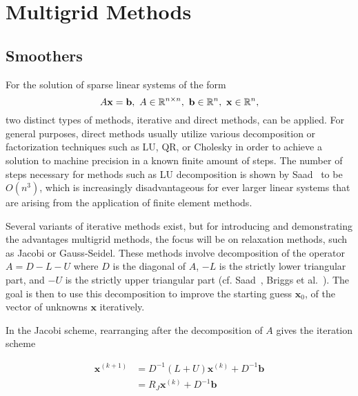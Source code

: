 
\chapter{Multigrid Methods}
\label{chapter:MultigridMethods}

\section{Smoothers}

For the solution of sparse linear systems of the form
\begin{equation}
	A\mathbf{x} = \mathbf{b},\ A \in \mathbb{R}^{n \times n},\ \mathbf{b} \in \mathbb{R}^n,\ \mathbf{x} \in \mathbb{R}^n, 
\end{equation}
two distinct types of methods, iterative and direct methods, can be applied. For general purposes, direct methods usually utilize various decomposition or factorization techniques such as LU, QR, or Cholesky in order to achieve a solution to machine precision in a known finite amount of steps. The number of steps necessary for methods such as LU decomposition is shown by Saad~\cite{Saad2003} to be $O(n^3)$, which is increasingly disadvantageous for ever larger linear systems that are arising from the application of finite element methods.

Several variants of iterative methods exist, but for introducing and demonstrating the advantages multigrid methods, the focus will be on relaxation methods, such as Jacobi or Gauss-Seidel. These methods involve decomposition of the operator $A = D - L - U$ where $D$ is the diagonal of $A$, $-L$ is the strictly lower triangular part, and $-U$ is the strictly upper triangular part (cf. Saad~\cite{Saad2003}, Briggs et al.~\cite{Briggs2000}). The goal is then to use this decomposition to improve the starting guess $\mathbf{x}_{0}$, of the vector of unknowns $\mathbf{x}$ iteratively.

In the Jacobi scheme, rearranging after the decomposition of $A$ gives the iteration scheme

\begin{equation}
	\begin{aligned}
	\mathbf{x}^{(k+1)} &= D^{-1}(L + U)\mathbf{x}^{(k)} + D^{-1}\mathbf{b} \\
	                   &= R_J\mathbf{x}^{(k)} + D^{-1} \mathbf{b}
	\end{aligned}
\end{equation}


